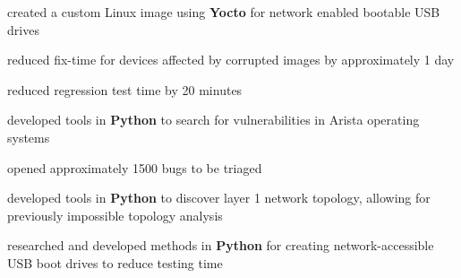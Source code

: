 \documentclass[a4paper]{style}
\begin{document}
\begin{minipage}[t]{0.54\textwidth}
\vspace{-1pt}
\begin{tightitemize}
    \item created a custom Linux image using \textbf{Yocto} for network enabled bootable USB drives
        \vspace{2pt}
        \begin{tightitemize}
            \item reduced fix-time for devices affected by corrupted images by approximately 1 day
            \item reduced regression test time by 20 minutes
        \end{tightitemize}
        \vspace{1pt}
    \item developed tools in \textbf{Python} to search for vulnerabilities in Arista operating systems
        \vspace{2pt}
        \begin{tightitemize}
            \item opened approximately 1500 bugs to be triaged
        \end{tightitemize}
\end{tightitemize}
\sectionspace{} %

\vspace{-1pt}
\begin{tightitemize}
    \item developed tools in \textbf{Python} to discover layer 1 network topology, allowing for previously impossible topology analysis
    \item researched and developed methods in \textbf{Python} for creating network-accessible USB boot drives to reduce testing time
\end{tightitemize}
\sectionspace{} %


\end{minipage}
\end{document}
